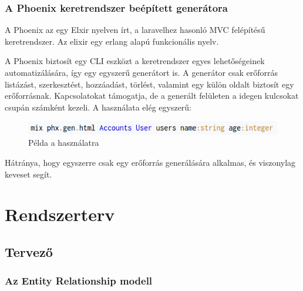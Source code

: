\documentclass[a4paper,12pt,oneside]{report}
\begin{document}
\newpage
\subsubsection{A Phoenix keretrendszer beépített generátora}

\begin{justify}
	A Phoenix az egy Elxir nyelven írt, a laravelhez hasonló MVC felépítésű keretrendszer. Az elixir egy erlang alapú funkcionális nyelv. 

	A Phoenix biztosít egy CLI eszközt a keretrendszer egyes lehetőségeinek automatizálására, így egy egyszerű generátort is. A generátor csak erőforrás listázást, szerkesztést, hozzáadást, törlést, valamint egy külön oldalt biztosít egy erőforrásnak. Kapcsolatokat támogatja, de a generált felületen a idegen kulcsokat csupán számként kezeli. A használata elég egyszerű: 

	\begin{figure}[h]
		\includegraphics[width=\textwidth]{contents/images/mix_phx_gen_html.png}
		\caption{Példa a használatra}
		\label{fig:mix_phx_gen_html}
	\end{figure}

	Hátránya, hogy egyszerre csak egy erőforrás generálására alkalmas, és viszonylag keveset segít.

\end{justify}

\newpage
\section{Rendszerterv}
\subsection{Tervező}
\subsubsection{Az Entity Relationship modell}
\end{document}
